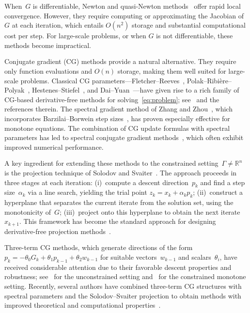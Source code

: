\documentclass{article}
\theoremstyle{plain}
\theoremstyle{definition}
\theoremstyle{remark}
\newcommand{\R}{\mathbb{R}}
\begin{document}
When~$G$ is differentiable, Newton and quasi-Newton methods~\cite{nocedal1999numerical, iusem1997newton} offer rapid local convergence. However, they require computing or approximating the Jacobian of~$G$ at each iteration, which entails $O(n^2)$ storage and substantial computational cost per step. For large-scale problems, or when $G$ is not differentiable, these methods become impractical.

Conjugate gradient (CG) methods provide a natural alternative. They require only function evaluations and $O(n)$ storage, making them well suited for large-scale problems. Classical CG parameters---Fletcher--Reeves~\cite{fletcher1964function}, Polak--Ribi\`{e}re--Polyak~\cite{polyak1969conjugate}, Hestenes--Stiefel~\cite{hestenes1952methods}, and Dai--Yuan~\cite{dai1999nonlinear}---have given rise to a rich family of CG-based derivative-free methods for solving~\eqref{eq:problem}; see~\cite{cheng2009prp, li2011class, liu2015projection, xiao2013conjugate} and the references therein. The spectral gradient method of Zhang and Zhou~\cite{zhang2006spectral}, which incorporates Barzilai--Borwein step sizes~\cite{barzilai1988two}, has proven especially effective for monotone equations. The combination of CG update formulas with spectral parameters has led to spectral conjugate gradient methods~\cite{birgin2000nonmonotone, abubakar2022hybrid}, which often exhibit improved numerical performance.

A key ingredient for extending these methods to the constrained setting~$\Gamma \neq \R^n$ is the projection technique of Solodov and Svaiter~\cite{solodov1999globally}. The approach proceeds in three stages at each iteration: (i)~compute a descent direction~$p_k$ and find a step size~$\alpha_k$ via a line search, yielding the trial point $z_k = x_k + \alpha_k p_k$; (ii)~construct a hyperplane that separates the current iterate from the solution set, using the monotonicity of~$G$; (iii)~project onto this hyperplane to obtain the next iterate~$x_{k+1}$. This framework has become the standard approach for designing derivative-free projection methods~\cite{yu2009spectral, wang2016self, gao2018efficient, zheng2020modified}.

Three-term CG methods, which generate directions of the form $p_k = -\theta_0 G_k + \theta_1 p_{k-1} + \theta_2 w_{k-1}$ for suitable vectors~$w_{k-1}$ and scalars~$\theta_i$, have received considerable attention due to their favorable descent properties and robustness; see~\cite{zhang2007some, andrei2013three, narushima2011three} for the unconstrained setting and~\cite{zheng2020conjugate, ibrahim2023two, liu2022three, liu2025threeterm} for the constrained monotone setting. Recently, several authors have combined three-term CG structures with spectral parameters and the Solodov--Svaiter projection to obtain methods with improved theoretical and computational properties~\cite{waziri2022double, abubakar2022hybrid, waziri2020descent}.
\end{document}
